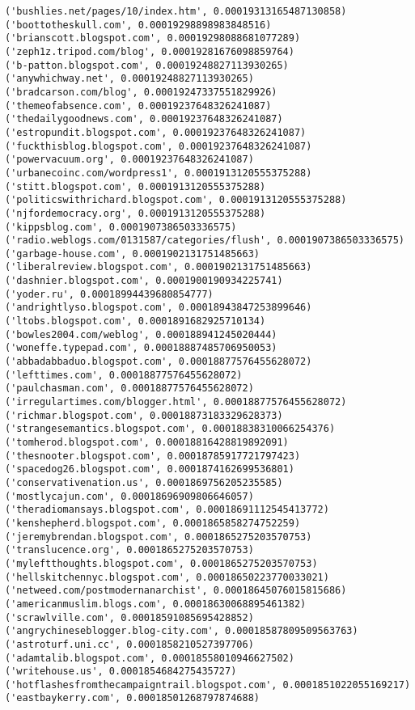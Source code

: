 \documentclass[11pt]{article}
\begin{document}
\begin{Verbatim}[commandchars=\\\{\}]
('bushlies.net/pages/10/index.htm', 0.00019313165487130858)
('boottotheskull.com', 0.00019298898983848516)
('brianscott.blogspot.com', 0.00019298088681077289)
('zeph1z.tripod.com/blog', 0.00019281676098859764)
('b-patton.blogspot.com', 0.00019248827113930265)
('anywhichway.net', 0.00019248827113930265)
('bradcarson.com/blog', 0.00019247337551829926)
('themeofabsence.com', 0.00019237648326241087)
('thedailygoodnews.com', 0.00019237648326241087)
('estropundit.blogspot.com', 0.00019237648326241087)
('fuckthisblog.blogspot.com', 0.00019237648326241087)
('powervacuum.org', 0.00019237648326241087)
('urbanecoinc.com/wordpress1', 0.0001913120555375288)
('stitt.blogspot.com', 0.0001913120555375288)
('politicswithrichard.blogspot.com', 0.0001913120555375288)
('njfordemocracy.org', 0.0001913120555375288)
('kippsblog.com', 0.0001907386503336575)
('radio.weblogs.com/0131587/categories/flush', 0.0001907386503336575)
('garbage-house.com', 0.0001902131751485663)
('liberalreview.blogspot.com', 0.0001902131751485663)
('dashnier.blogspot.com', 0.0001900190934225741)
('yoder.ru', 0.00018994439680854777)
('andrightlyso.blogspot.com', 0.00018943847253899646)
('ltobs.blogspot.com', 0.0001891682925710134)
('bowles2004.com/weblog', 0.000188941245020444)
('woneffe.typepad.com', 0.00018887485706950053)
('abbadabbaduo.blogspot.com', 0.00018877576455628072)
('lefttimes.com', 0.00018877576455628072)
('paulchasman.com', 0.00018877576455628072)
('irregulartimes.com/blogger.html', 0.00018877576455628072)
('richmar.blogspot.com', 0.00018873183329628373)
('strangesemantics.blogspot.com', 0.00018838310066254376)
('tomherod.blogspot.com', 0.00018816428819892091)
('thesnooter.blogspot.com', 0.00018785917721797423)
('spacedog26.blogspot.com', 0.0001874162699536801)
('conservativenation.us', 0.0001869756205235585)
('mostlycajun.com', 0.00018696909806646057)
('theradiomansays.blogspot.com', 0.00018691112545413772)
('kenshepherd.blogspot.com', 0.0001865858274752259)
('jeremybrendan.blogspot.com', 0.0001865275203570753)
('translucence.org', 0.0001865275203570753)
('myleftthoughts.blogspot.com', 0.0001865275203570753)
('hellskitchennyc.blogspot.com', 0.00018650223770033021)
('netweed.com/postmodernanarchist', 0.00018645076015815686)
('americanmuslim.blogs.com', 0.00018630068895461382)
('scrawlville.com', 0.00018591085695428852)
('angrychineseblogger.blog-city.com', 0.00018587809509563763)
('astroturf.uni.cc', 0.0001858210527397706)
('adamtalib.blogspot.com', 0.00018558010946627502)
('writehouse.us', 0.0001854684275435727)
('hotflashesfromthecampaigntrail.blogspot.com', 0.0001851022055169217)
('eastbaykerry.com', 0.00018501268797874688)

\end{Verbatim}
\end{document}

